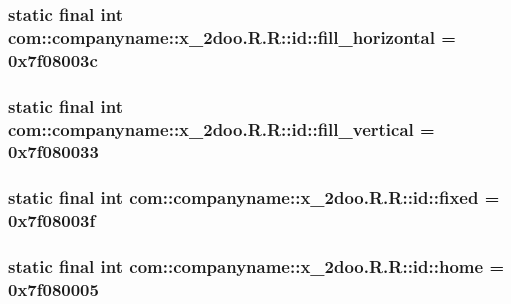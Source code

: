 \hypertarget{classcom_1_1companyname_1_1x__2doo_1_1_r_1_1id_7b23f5e38d15db7e653e7d835771f4b8}{
\subsubsection[{fill\_\-horizontal}]{\setlength{\rightskip}{0pt plus 5cm}static final int com::companyname::x\_\-2doo.R.R::id::fill\_\-horizontal = 0x7f08003c}}
\label{classcom_1_1companyname_1_1x__2doo_1_1_r_1_1id_7b23f5e38d15db7e653e7d835771f4b8}


\hypertarget{classcom_1_1companyname_1_1x__2doo_1_1_r_1_1id_ec117a6c5fd358a936def7015f1d2585}{
\subsubsection[{fill\_\-vertical}]{\setlength{\rightskip}{0pt plus 5cm}static final int com::companyname::x\_\-2doo.R.R::id::fill\_\-vertical = 0x7f080033}}
\label{classcom_1_1companyname_1_1x__2doo_1_1_r_1_1id_ec117a6c5fd358a936def7015f1d2585}


\hypertarget{classcom_1_1companyname_1_1x__2doo_1_1_r_1_1id_2193e96c62b07ab30ea00562c6140743}{
\subsubsection[{fixed}]{\setlength{\rightskip}{0pt plus 5cm}static final int com::companyname::x\_\-2doo.R.R::id::fixed = 0x7f08003f}}
\label{classcom_1_1companyname_1_1x__2doo_1_1_r_1_1id_2193e96c62b07ab30ea00562c6140743}


\hypertarget{classcom_1_1companyname_1_1x__2doo_1_1_r_1_1id_76cb59622685e3bf14872560652f5192}{
\subsubsection[{home}]{\setlength{\rightskip}{0pt plus 5cm}static final int com::companyname::x\_\-2doo.R.R::id::home = 0x7f080005}}
\label{classcom_1_1companyname_1_1x__2doo_1_1_r_1_1id_76cb59622685e3bf14872560652f5192}



